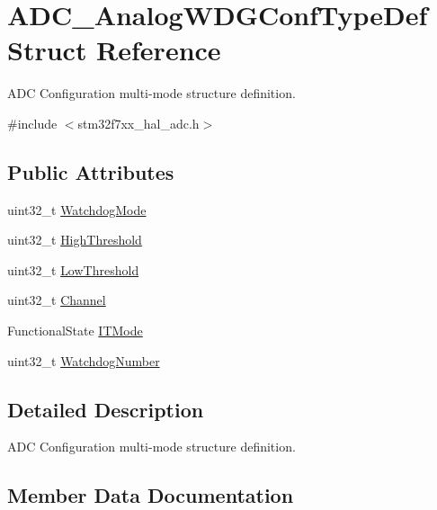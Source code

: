 \hypertarget{struct_a_d_c___analog_w_d_g_conf_type_def}{}\section{A\+D\+C\+\_\+\+Analog\+W\+D\+G\+Conf\+Type\+Def Struct Reference}
\label{struct_a_d_c___analog_w_d_g_conf_type_def}


A\+DC Configuration multi-\/mode structure definition.  




{\ttfamily \#include $<$stm32f7xx\+\_\+hal\+\_\+adc.\+h$>$}

\subsection*{Public Attributes}
\begin{DoxyCompactItemize}
\item 
uint32\+\_\+t \mbox{\hyperlink{struct_a_d_c___analog_w_d_g_conf_type_def_ad4c60783321a30e8edffa323148e424d}{Watchdog\+Mode}}
\item 
uint32\+\_\+t \mbox{\hyperlink{struct_a_d_c___analog_w_d_g_conf_type_def_a9bee62b3d364713a16a15cefcc217e65}{High\+Threshold}}
\item 
uint32\+\_\+t \mbox{\hyperlink{struct_a_d_c___analog_w_d_g_conf_type_def_a77e1743ebd27333ac2c9de55a25cd4c8}{Low\+Threshold}}
\item 
uint32\+\_\+t \mbox{\hyperlink{struct_a_d_c___analog_w_d_g_conf_type_def_abc86b5861e3eff802fe765e62054f348}{Channel}}
\item 
Functional\+State \mbox{\hyperlink{struct_a_d_c___analog_w_d_g_conf_type_def_a3bdb322d2f20ec5b94ae50ad954618af}{I\+T\+Mode}}
\item 
uint32\+\_\+t \mbox{\hyperlink{struct_a_d_c___analog_w_d_g_conf_type_def_a025e81af21b93c5b8daf9f5241383302}{Watchdog\+Number}}
\end{DoxyCompactItemize}


\subsection{Detailed Description}
A\+DC Configuration multi-\/mode structure definition. 



\subsection{Member Data Documentation}
\mbox{\label{struct_a_d_c___analog_w_d_g_conf_type_def_abc86b5861e3eff802fe765e62054f348}} 
